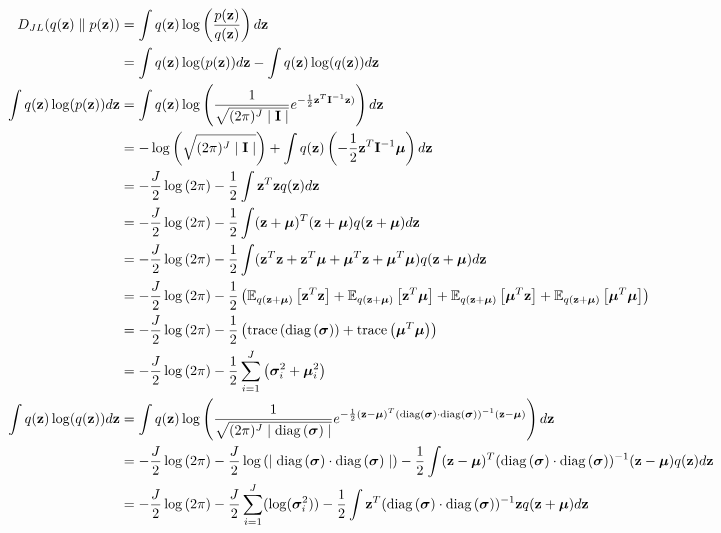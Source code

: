 \documentclass[a4paper]{article}
\begin{document}
\begin{align*}
    \label{eq:}
    D_{JL}(q(\vz) \parallel p(\vz)) & = \int q(\vz)
    \log\left(\frac{p(\vz)}{q(\vz)}\right) d\vz
    \\
    & = \int q(\vz) \log(p(\vz)) d\vz - \int q(\vz) \log(q(\vz)) d\vz 
    \\
    \int q(\vz) \log(p(\vz)) d\vz & = \int 
    q(\vz)
    \log\left(
    \frac{1}{\sqrt{(2\pi)^J \mid \mI \mid }}
    e^{-\frac{1}{2} \vz^T \mI^{-1} \vz)}
    \right) d\vz
    \\
    & = -\log\left(\sqrt{(2\pi)^J \mid \mI \mid } \right) + \int q(\vz)
    \left(-\frac{1}{2} \vz^T \mI^{-1} \vmu \right) d\vz 
    \\
    & = -\frac{J}{2} \log\left( 2\pi \right) - \frac{1}{2} \int
    \vz^T \vz q(\vz) d\vz
    \\
    & = -\frac{J}{2} \log\left( 2\pi \right) - \frac{1}{2} \int
    (\vz + \vmu)^T (\vz + \vmu) q(\vz + \vmu) d\vz
    \\
    & = -\frac{J}{2} \log\left( 2\pi \right) - \frac{1}{2} \int
    (\vz^T \vz + \vz^T \vmu + \vmu^T \vz + \vmu^T \vmu)
    q(\vz + \vmu) d\vz
    \\
    & = -\frac{J}{2} \log\left( 2\pi \right) - \frac{1}{2} \left(
    \EE{q(\vz + \vmu)}{\vz^T \vz} + \EE{q(\vz + \vmu)}{\vz^T \vmu} +
    \EE{q(\vz + \vmu)}{\vmu^T \vz} + \EE{q(\vz + \vmu)}{\vmu^T \vmu} \right)
    \\
    & = -\frac{J}{2} \log\left( 2\pi \right) - \frac{1}{2} \left(
    \trace{\diag{\vsigma} } + \trace{\vmu^T \vmu} \right)
    \\
    & = -\frac{J}{2} \log\left( 2\pi \right) - \frac{1}{2}
    \sumt{i=1}{J} \left( \vsigma_i^2 + \vmu_i^2 \right)
    \\
    \int q(\vz) \log(q(\vz)) d\vz & = \int 
    q(\vz)
    \log\left(
    \frac{1}{\sqrt{(2\pi)^J \mid \diag{\vsigma} \mid }}
    e^{-\frac{1}{2} (\vz - \vmu)^T (\diag{\vsigma} \cdot \diag{\vsigma})^{-1} (\vz - \vmu)}
    \right) d\vz
    \\ 
    & = -\frac{J}{2} \log\left( 2\pi \right) -
    \frac{J}{2} \log\left( \mid \diag{\vsigma} \cdot \diag{\vsigma} \mid \right) - \frac{1}{2} \int
    (\vz - \vmu)^T (\diag{\vsigma} \cdot \diag{\vsigma})^{-1} (\vz
    - \vmu) q(\vz) d\vz
    \\
    & = -\frac{J}{2} \log\left( 2\pi \right) -
    \frac{J}{2} \sumt{i=1}{J}(\log(\vsigma_i^2)) - \frac{1}{2} \int
    \vz^T (\diag{\vsigma} \cdot \diag{\vsigma})^{-1} \vz q(\vz + \vmu) d\vz
    \\

\end{align*}
\end{document}
